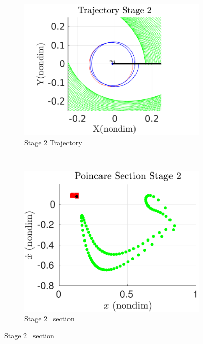 \documentclass[smallcondensed]{svjour3}
\begin{document}
\begin{figure}[htbp]
    \begin{subfigure}[htbp]{0.5\textwidth} 
        \includegraphics[width=\textwidth, keepaspectratio]{figures/geo_transfer/stage2_trajectory_zoom.pdf} 
        \caption{Stage 2 Trajectory~\label{fig:stage2_trajecotry_zoom}} 
    \end{subfigure}~
    \begin{subfigure}[htbp]{0.5\textwidth} 
        \includegraphics[width=\textwidth, keepaspectratio]{figures/geo_transfer/stage2_poincare.pdf} 
        \caption{Stage 2 \Poincare~section \label{fig:stage2_poincare}} 
    \end{subfigure}


\end{figure}
\end{document}
